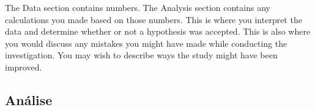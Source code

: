 

The Data section contains numbers. The Analysis section contains any calculations you made based on those numbers. This is where you interpret the data and determine whether or not a hypothesis was accepted. This is also where you would discuss any mistakes you might have made while conducting the investigation. You may wish to describe ways the study might have been improved.



\subsection{Análise}
\label{analise}


